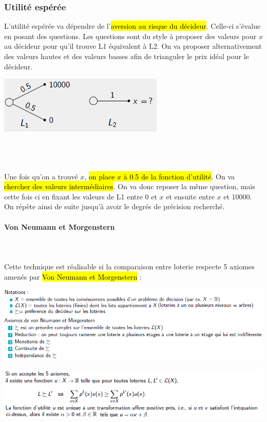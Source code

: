 \documentclass[a4paper, 12pt]{article}
\newcommand{\alinea}{
\hspace*{0.5cm}}
\begin{document}
		\subsubsection{Utilité espérée}
			\begin{minipage}{0.66\textwidth}
				\alinea L'utilité espérée va dépendre de l'\hl{aversion au risque du décideur}. Celle-ci s'évalue en posant des questions.
				Les questions sont du style à proposer des valeurs pour $x$ au décideur pour qu'il trouve L1 équivalent à L2. 
				On va proposer alternativement des valeurs hautes et des valeurs basses afin de trianguler le prix idéal pour le décideur.
			\end{minipage}\hfill
			\begin{minipage}{0.3\textwidth}
				\includegraphics[width=\textwidth]{Images/aversion}
			\end{minipage}~\\~\\~\\
			Une fois qu'on a trouvé $x$, \hl{on place $x$ à 0.5 de la fonction d'utilité}. On va \hl{chercher des valeurs intermédiaires}. 
				On va donc reposer la même question, mais cette fois ci en fixant les valeurs de L1 entre  0 et $x$ et ensuite entre $x$ 
				et 10000. On répète ainsi de suite jusqu'à avoir le degrés de précision recherché.
			\paragraph{Von Neumann et Morgenstern}~\\~\\
				\alinea Cette technique est réalisable si la comparaison entre loterie respecte 5 axiomes amenés par 
					\hl{Von Neumann et Morgenstern} : 
				\begin{center}
					\includegraphics[width=\textwidth]{Images/von_neumann-morgenstern}
				\end{center}
				\begin{center}
					\includegraphics[width=\textwidth]{Images/von_neumann-morgenstern2}
				\end{center}
\end{document}
